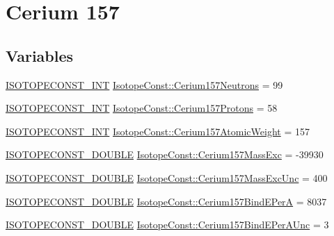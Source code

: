 \hypertarget{group___isotope_const-_cerium-_ce157}{}\section{Cerium 157}
\label{group___isotope_const-_cerium-_ce157}
\subsection*{Variables}
\begin{DoxyCompactItemize}
\item 
\mbox{\hyperlink{group___isotope_const-_macros_ga5f18360b3e99483a35c32d789e62621c}{I\+S\+O\+T\+O\+P\+E\+C\+O\+N\+S\+T\+\_\+\+I\+NT}} \mbox{\hyperlink{group___isotope_const-_cerium-_ce157_ga4bc7d676031b19620680aee7d50e1dea}{Isotope\+Const\+::\+Cerium157\+Neutrons}} = 99
\item 
\mbox{\hyperlink{group___isotope_const-_macros_ga5f18360b3e99483a35c32d789e62621c}{I\+S\+O\+T\+O\+P\+E\+C\+O\+N\+S\+T\+\_\+\+I\+NT}} \mbox{\hyperlink{group___isotope_const-_cerium-_ce157_gad3d5368ea9a91268aa68f52a20054b42}{Isotope\+Const\+::\+Cerium157\+Protons}} = 58
\item 
\mbox{\hyperlink{group___isotope_const-_macros_ga5f18360b3e99483a35c32d789e62621c}{I\+S\+O\+T\+O\+P\+E\+C\+O\+N\+S\+T\+\_\+\+I\+NT}} \mbox{\hyperlink{group___isotope_const-_cerium-_ce157_ga40361bea0ac02453a39278d86c7532cb}{Isotope\+Const\+::\+Cerium157\+Atomic\+Weight}} = 157
\item 
\mbox{\hyperlink{group___isotope_const-_macros_ga8f45a7272ce02c0b4c65c44636ed719a}{I\+S\+O\+T\+O\+P\+E\+C\+O\+N\+S\+T\+\_\+\+D\+O\+U\+B\+LE}} \mbox{\hyperlink{group___isotope_const-_cerium-_ce157_ga0e90e82a9b840629b8c089c55081b40e}{Isotope\+Const\+::\+Cerium157\+Mass\+Exc}} = -\/39930
\item 
\mbox{\hyperlink{group___isotope_const-_macros_ga8f45a7272ce02c0b4c65c44636ed719a}{I\+S\+O\+T\+O\+P\+E\+C\+O\+N\+S\+T\+\_\+\+D\+O\+U\+B\+LE}} \mbox{\hyperlink{group___isotope_const-_cerium-_ce157_ga4a1812fe28f4ea4f93444a3929ef323d}{Isotope\+Const\+::\+Cerium157\+Mass\+Exc\+Unc}} = 400
\item 
\mbox{\hyperlink{group___isotope_const-_macros_ga8f45a7272ce02c0b4c65c44636ed719a}{I\+S\+O\+T\+O\+P\+E\+C\+O\+N\+S\+T\+\_\+\+D\+O\+U\+B\+LE}} \mbox{\hyperlink{group___isotope_const-_cerium-_ce157_ga669d1912b92bb758a2421499354d0164}{Isotope\+Const\+::\+Cerium157\+Bind\+E\+PerA}} = 8037
\item 
\mbox{\hyperlink{group___isotope_const-_macros_ga8f45a7272ce02c0b4c65c44636ed719a}{I\+S\+O\+T\+O\+P\+E\+C\+O\+N\+S\+T\+\_\+\+D\+O\+U\+B\+LE}} \mbox{\hyperlink{group___isotope_const-_cerium-_ce157_gac48a05803f7a9a77c118647c5307a1be}{Isotope\+Const\+::\+Cerium157\+Bind\+E\+Per\+A\+Unc}} = 3

\end{DoxyCompactItemize}
